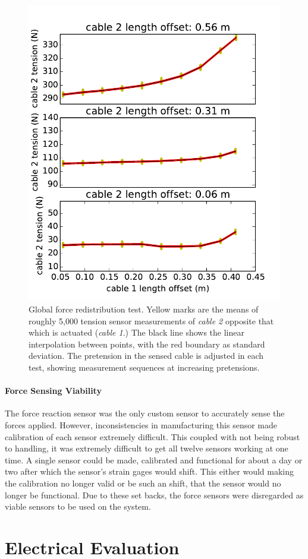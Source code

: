 \begin{appendices}
\begin{figure}[thpb]
      \centering
      \includegraphics[width=0.55\columnwidth]{tex/img/sensor2_original}
      \caption{Global force redistribution test. Yellow marks are the means of roughly 5,000 tension sensor measurements of \emph{cable 2} opposite that which is actuated (\emph{cable 1}.) The black line shows the linear interpolation between points, with the red boundary as standard deviation. The pretension in the sensed cable is adjusted in each test, showing measurement sequences at increasing pretensions.}
      \label{fig:sensor2data_forcedistribution}
\end{figure}

\paragraph{Force Sensing Viability}
The force reaction sensor was the only custom sensor to accurately sense the forces applied.
However, inconsistencies in manufacturing this sensor made calibration of each sensor extremely difficult.
This coupled with not being robust to handling, it was extremely difficult to get all twelve sensors working at one time.
A single sensor could be made, calibrated and functional for about a day or two after which the sensor's strain gages would shift.
This either would making the calibration no longer valid or be such an shift, that the sensor would no longer be functional.
Due to these set backs, the force sensors were disregarded as viable sensors to be used on the system.

\section{Electrical Evaluation}


\end{appendices}
